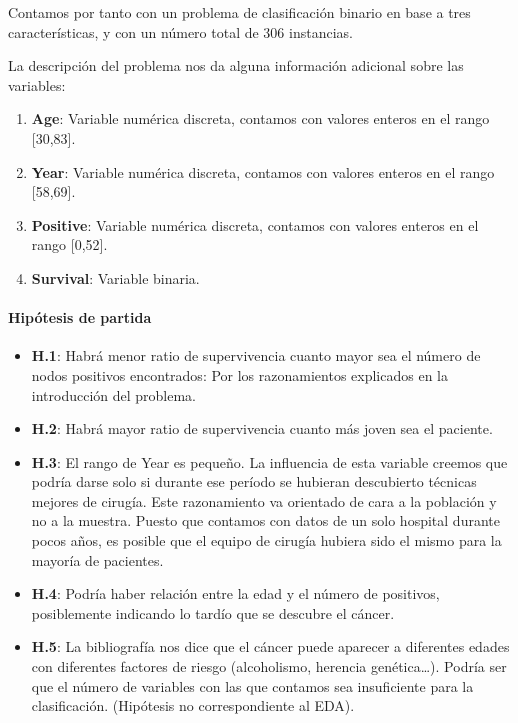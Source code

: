 
Contamos por tanto con un problema de clasificación binario en base a tres características, y con un número total de 306 instancias.

\vspace{\baselineskip}

La descripción del problema nos da alguna información adicional sobre las variables:

\begin{enumerate}
    \def\labelenumi{\arabic{enumi}.}
    \item \textbf{Age}: Variable numérica discreta, contamos con valores enteros en el
    rango {[}30,83{]}.
    \item \textbf{Year}: Variable numérica discreta, contamos con valores enteros en el
    rango {[}58,69{]}.
    \item \textbf{Positive}: Variable numérica discreta, contamos con valores enteros en
    el rango {[}0,52{]}.
    \item \textbf{Survival}: Variable binaria.
\end{enumerate}

\paragraph{Hipótesis de partida}

\begin{itemize}
    \item \textbf{H.1}: Habrá menor ratio de supervivencia cuanto mayor sea el número de nodos positivos encontrados: Por los razonamientos explicados en la introducción del problema.
    \item \textbf{H.2}: Habrá mayor ratio de supervivencia cuanto más joven sea el paciente.
    \item \textbf{H.3}: El rango de Year es pequeño. La influencia de esta variable creemos que podría darse solo si durante ese período se hubieran descubierto técnicas mejores de cirugía. Este razonamiento va orientado de cara a la población y no a la muestra. Puesto que contamos con datos de un solo hospital durante pocos años, es posible que el equipo de cirugía hubiera sido el mismo para la mayoría de pacientes.
    \item \textbf{H.4}: Podría haber relación entre la edad y el número de positivos, posiblemente indicando lo tardío que se descubre el cáncer.
    \item \textbf{H.5}: La bibliografía nos dice que el cáncer puede aparecer a diferentes edades con diferentes factores de riesgo (alcoholismo, herencia genética\ldots). Podría ser que el número de variables con las que contamos sea insuficiente para la clasificación. (Hipótesis no correspondiente al EDA).
\end{itemize}

